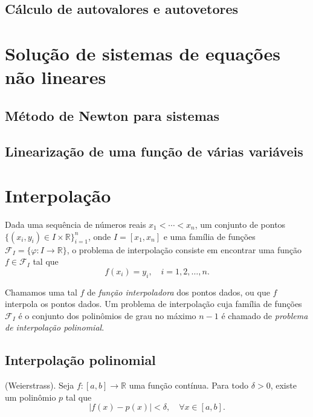 \documentclass{article}
\begin{document}
\subsection{Cálculo de autovalores e autovetores}

\section{Solução de sistemas de equações não lineares}

\subsection{Método de Newton para sistemas}
\subsection{Linearização de uma função de várias variáveis}

\section{Interpolação}

Dada uma sequência de números reais \(x_1 < \cdots < x_n\), um conjunto de pontos \(\{(x_i, y_i) \in I \times \mathbb{R}\}_{i=1}^{n}\), onde \(I = [x_1, x_n]\) e uma família de funções \(\mathcal{F}_I = \{\varphi : I \to \mathbb{R}\}\), o problema de interpolação consiste em encontrar uma função \(f \in \mathcal{F}_I\) tal que \[f(x_i) = y_i, \quad i = 1, 2, \ldots, n.\]

Chamamos uma tal \(f\) de \emph{função interpoladora} dos pontos dados, ou que \(f\) interpola os pontos dados. Um problema de interpolação cuja família de funções \(\mathcal{F}_I\) é o conjunto dos polinômios de grau no máximo \(n-1\) é chamado de \emph{problema de interpolação polinomial}.

\subsection{Interpolação polinomial}

\begin{thm} (Weierstrass).
    Seja \(f : [a, b] \to \mathbb{R}\) uma função contínua. Para todo \(\delta > 0\), existe um polinômio \(p\) tal que
    \begin{equation}
        \vert f(x) - p(x) \vert < \delta, \quad \forall x \in [a, b].
    \end{equation}
\end{thm}
\end{document}
